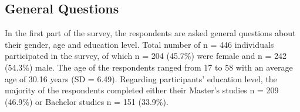 \subsection{General Questions}
In the first part of the survey, the respondents are asked general questions about their gender, age and education level. Total number of n = 446 individuals participated in the survey, of which n = 204 (45.7\%) were female and n = 242 (54.3\%) male. The age of the respondents ranged from 17 to 58 with an average age of 30.16 years (SD = 6.49). %
Regarding participants' education level, the majority of the respondents completed either their Master's studies n = 209 (46.9\%) or Bachelor studies n = 151 (33.9\%). %
